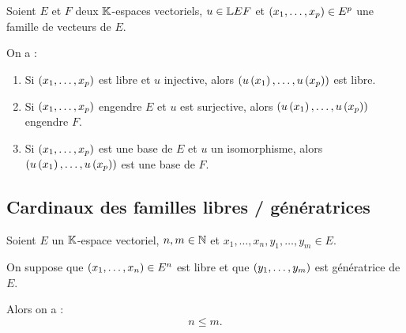 \begin{rappel}
Soient \(E\) et \(F\) deux \(\mathbb{K}\)-espaces vectoriels, \(u\in\mathbb{L}{E}{F}\) et \(\left(x_1,\dots,x_p\right)\in E^p\) une famille de vecteurs de \(E\).

On a :

\begin{enumerate}
\item Si \(\left(x_1,\dots,x_p\right)\) est libre et \(u\) injective, alors \(\left(u\left(x_1\right),\dots,u\left(x_p\right)\right)\) est libre. \\

\item Si \(\left(x_1,\dots,x_p\right)\) engendre \(E\) et \(u\) est surjective, alors \(\left(u\left(x_1\right),\dots,u\left(x_p\right)\right)\) engendre \(F\). \\

\item Si \(\left(x_1,\dots,x_p\right)\) est une base de \(E\) et \(u\) un isomorphisme, alors \(\left(u\left(x_1\right),\dots,u\left(x_p\right)\right)\) est une base de \(F\).
\end{enumerate}
\end{rappel}

\subsection{Cardinaux des familles libres / génératrices}

\begin{lem}
Soient \(E\) un \(\mathbb{K}\)-espace vectoriel, \(n,m\in\mathbb{N}\) et \(x_1,\dots,x_n,y_1,\dots,y_m\in E\).

On suppose que \(\left(x_1,\dots,x_n\right)\in E^n\) est libre et que \(\left(y_1,\dots,y_m\right)\) est génératrice de \(E\).

Alors on a : \[n\leq m.\]
\end{lem}

